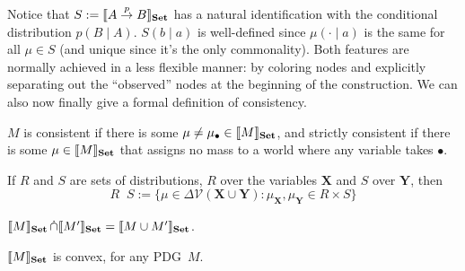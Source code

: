 \documentclass{article}
\newcommand\changeon{\color{note-fg} }
\newcommand\changeoff{\color{black} }
\newcommand\Set{\textbf{Set}}
\newcommand\bmu{\boldsymbol{\mu}}
\newcommand{\MN}{PDG}
\DeclareMathOperator\dcap{\mathop{\dot\cap}}
\begin{document}
	\changeon
	Notice that $S := \bbr{
		A \overset{p}{\to} B
	}_\Set$ has a natural identification with 
	the conditional distribution $p( B \mid A)$. $S(b\mid a)$ is well-defined since $\mu(\cdot\mid a)$ is the same for all $\mu \in S$ (and unique since it's the only commonality). Both features are normally achieved in a less flexible manner: by coloring nodes and explicitly separating out the ``observed'' nodes at the beginning of the construction.
	We can also now finally give a formal definition of consistency.
	\begin{defn} \label{def:weak-consistent}
		$M$ is consistent if there is some $\mu \neq \mu_\bullet \in \bbr{M}_\Set$, and strictly consistent if there is some $\mu \in \bbr{M}_\Set$ that assigns no mass to a world where any variable takes $\bullet$.
	\end{defn}
	
	
	If $R$ and $S$ are sets of distributions, $R$ over the variables $\mathbf X$ and $S$ over $\mathbf Y$, then
	$$R \dcap S := \{ \mu \in  \Delta \mathcal V(\mathbf X \cup \mathbf Y) : \mu_{\mathbf X}, \mu_{\mathbf Y} \in R \times S \}  $$
	\begin{prop}
		$\bbr{M}_\Set \dcap \bbr{M'}_\Set = \bbr{M \cup M'}_\Set$.
	\end{prop}

	\changeoff
	
	\begin{lemma}[restate=thmsetconvex] 
		\label{prop:convex}
		$\bbr{M}_\Set$ is convex, for any \MN\ $M$.
	\end{lemma}%


\end{document}

